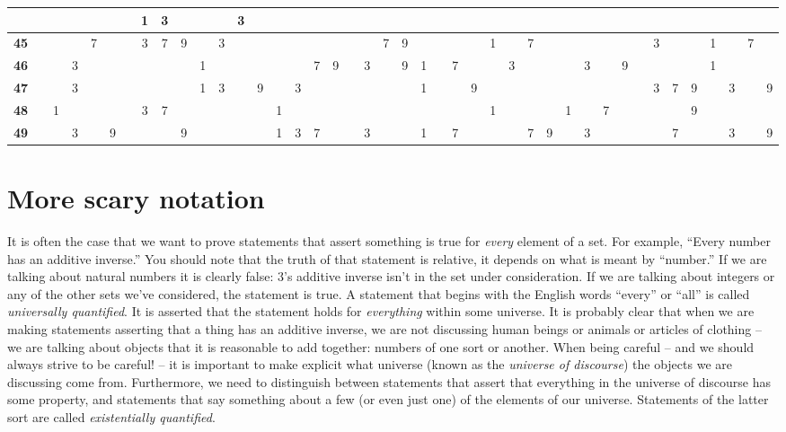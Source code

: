 {\begin{tabular}{|lr|cccc|cccc|cccc|cccc|cccc|cccc|cccc|cccc|cccc|cccc|}
& & & & & & & 1 & 3 & & & & 3 & & \\ \hline
\rule{0pt}{9pt}\bf 45 & & & & 7 & & & 3 & 7 & 9 & & 3 & & & & & & & & & 7 & 9 & & & & & 1 & & 7 & & & & & & & 3 & & & 1 & & 7 & \\
\bf 46 & & & 3 & & & & & & & 1 & & & & & & 7 & 9 & & 3 & & 9 & 1 & & 7 & & & 3 & & & & 3 & & 9 & & & & & 1 & & & \\
\bf 47 & & & 3 & & & & & & & 1 & 3 & & 9 & & 3 & & & & & & & 1 & & & 9 & & & & & & & & & & 3 & 7 & 9 & & 3 & & 9 \\
\bf 48 & & 1 & & & & & 3 & 7 & & & & & & 1 & & & & & & & & & & & & 1 & & & & 1 & & 7 & & & & & 9 & & & & \\
\bf 49 & & & 3 & & 9 & & & & 9 & & & & & 1 & 3 & 7 & & & 3 & & & 1 & & 7 & &
& & 7 & 9 & & 3 & & & & & 7 & & & 3 & & 9 \\ \hline
\end{tabular}
}

\addtolength{\lineskip}{2pt}
\renewcommand{\arraystretch}{1}

\clearpage





\newpage

\section{More scary notation}
\label{sec:scary}

It is often the case that we want to prove statements that
assert something is true for {\em every} element of a set.
For example, ``Every number has an additive inverse.''
You should note that the truth of that statement is relative,
it depends on what is meant by ``number.''  If we are talking
about natural numbers it is clearly false:  3's additive 
inverse isn't in the set under consideration.  If we are
talking about integers or any of the other sets we've considered,
the statement is true.  A statement that begins with the English
words ``every'' or ``all'' is called 
\emph{universally quantified}.
It is asserted that the statement holds for {\em everything} within
some universe.  It is probably clear that when we are making
statements asserting that a thing has an additive inverse, we 
are not discussing human beings or animals or articles of clothing --
we are talking about objects that it is reasonable to add together:
numbers of one sort or another.  When being careful -- and we should always
strive to be careful! -- it is important to make explicit what 
universe (known as the \emph{universe of discourse}) the objects
we are discussing come from.  Furthermore, we need to distinguish 
between statements that assert that everything in the universe of
discourse has some property, and statements that say something
about a few (or even just one) of the elements of our universe.
Statements of the latter sort are called 
\emph{existentially quantified}.

